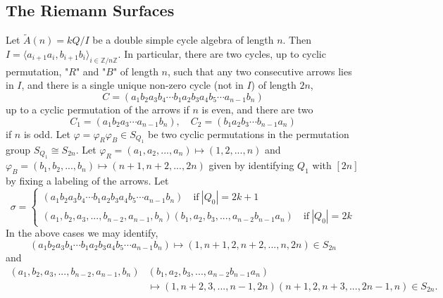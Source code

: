 \documentclass[11pt,oneside]{amsbook}
\numberwithin{equation}{section}
\theoremstyle{plain}
\theoremstyle{definition}
\theoremstyle{remark}
\newcommand{\ZZ}{\mathbb{Z}}
\newcommand{\la}{\langle}
\newcommand{\ra}{\rangle}
\begin{document}
	\subsection{The Riemann Surfaces}
	Let $\tilde{A}(n) = kQ/I$ be a double simple cycle algebra of length $n$. Then $I = \la a_{i+1}a_i, b_{i+1}b_i \ra_{i 
		\in \ZZ/n\ZZ}$. In particular, there are two cycles, up to cyclic permutation, "$R$" and "$B$" of length $n$, such that 
	any two consecutive arrows lies in $I$, and there is a single unique non-zero cycle (not in $I$) of length $2n$, 
	\[ C = (a_1b_2a_3b_4 \cdots b_1a_2b_3a_4b_5 \cdots a_{n-1}b_n) \] 
	up to a cyclic permutation of the arrows if $n$ is even, and there are two
	\[ C_1 = (a_1b_2a_3 \cdots a_{n-1}b_n), \quad C_2 = (b_1a_2b_3 \cdots b_{n-1}a_n) \]
	if $n$ is odd. Let $\varphi = \varphi_R \varphi_B \in S_{Q_1}$ be two cyclic permutations in the permutation group $S_{Q_1} \cong S_{2n}$. Let $\varphi_R = (a_1,a_2,...,a_n) \mapsto  (1,2,...,n)$ and $\varphi_B = (b_1, b_2, ..., b_n) \mapsto (n+1, n+2, ..., 2n)$ given by identifying $Q_1$ with $[2n]$ by fixing a labeling of the arrows. Let 
	\[
	\sigma =
	\begin{cases}
		(a_1b_2a_3b_4 \cdots b_1a_2b_3a_4b_5 \cdots a_{n-1}b_n) \quad \text{if} \ |Q_0|=2k+1 \\
		(a_1,b_2,a_3,..., b_{n-2},a_{n-1},b_n)(b_1,a_2,b_3,...,a_{n-2}b_{n-1}a_n) \quad \text{if}\ |Q_0|=2k
	\end{cases}
	\]
	In the above cases we may identify, 
	\[ (a_1b_2a_3b_4 \cdots b_1a_2b_3a_4b_5 \cdots a_{n-1}b_n) \mapsto (1, n+1, 2, n+2, ..., n, 2n) \in S_{2n} \]
	and
	\begin{align*}
		(a_1,b_2,a_3,..., b_{n-2},a_{n-1},b_n)&(b_1,a_2,b_3,...,a_{n-2}b_{n-1}a_n) \\
		&\mapsto (1,n+2,3,...,n-1,2n)(n+1,2,n+3,...,2n-1,n) \in S_{2n}.
	\end{align*}
	
\end{document}
